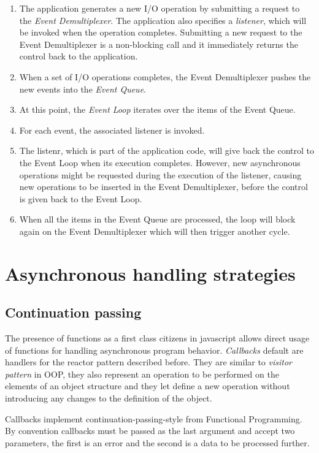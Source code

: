 \begin{enumerate}
	\item The application generates a new I/O operation by submitting a request to the \textit{Event Demultiplexer}. The application also specifies a \textit{listener}, which will be invoked when the operation completes. Submitting a new request to the Event Demultiplexer is a non-blocking call and it immediately returns the control back to the application.
	\item When a set of I/O operations completes, the Event Demultiplexer pushes the new events into the \textit{Event Queue}.
	\item At this point, the \textit{Event Loop} iterates over the items of the Event Queue.
	\item For each event, the associated listener is invoked.
	\item The listenr, which is part of the application code, will give back the control to the Event Loop when its execution completes. However, new asynchronous operations might be requested during the execution of the listener, causing new operations to be inserted in the Event Demultiplexer, before the control is given back to the Event Loop.
	\item When all the items in the Event Queue are processed, the loop will block again on the Event Demultiplexer which will then trigger another cycle.
\end{enumerate}

\section{Asynchronous handling strategies}
\label{sec:asyncstrat}
\subsection{Continuation passing}
The presence of functions as a first class citizens in javascript allows direct usage of functions for handling asynchronous program behavior. \textit{Callbacks} default are handlers for the reactor pattern described before. They are similar to \textit{visitor pattern} in OOP, they also represent an operation to be performed on the elements of an object structure and they let define a new operation without introducing any changes to the definition of the object. 

Callbacks implement continuation-passing-style from Functional Programming. By convention callbacks must be passed as the last argument and accept two parameters, the first is an error and the second is a data to be processed further.

